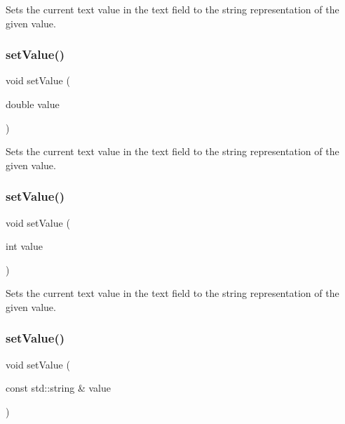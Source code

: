 Sets the current text value in the text field to the string representation of the given value. 

\mbox{\label{classGTextField_a1a31743bc7def7cf7fdad044c84d9268}} 
\subsubsection{\texorpdfstring{set\+Value()}{setValue()}\hspace{0.1cm}{\footnotesize\ttfamily [3/5]}}
{\footnotesize\ttfamily void set\+Value (\begin{DoxyParamCaption}\item[{double}]{value }\end{DoxyParamCaption})\hspace{0.3cm}{\ttfamily [virtual]}}



Sets the current text value in the text field to the string representation of the given value. 

\mbox{\label{classGTextField_a23d79e21b8ed72e19278ca31d47b8c87}} 
\subsubsection{\texorpdfstring{set\+Value()}{setValue()}\hspace{0.1cm}{\footnotesize\ttfamily [4/5]}}
{\footnotesize\ttfamily void set\+Value (\begin{DoxyParamCaption}\item[{int}]{value }\end{DoxyParamCaption})\hspace{0.3cm}{\ttfamily [virtual]}}



Sets the current text value in the text field to the string representation of the given value. 

\mbox{\label{classGTextField_ab18c7a418be64c4f909beebc277a1321}} 
\subsubsection{\texorpdfstring{set\+Value()}{setValue()}\hspace{0.1cm}{\footnotesize\ttfamily [5/5]}}
{\footnotesize\ttfamily void set\+Value (\begin{DoxyParamCaption}\item[{const std\+::string \&}]{value }\end{DoxyParamCaption})\hspace{0.3cm}{\ttfamily [virtual]}}



